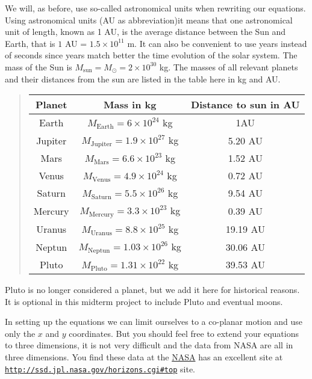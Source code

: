 \documentclass[%
oneside,                 %
final,                   %
10pt]{article}
\begin{document}
We will, as before, use so-called astronomical units when rewriting our equations. 
Using astronomical units (AU as abbreviation)it means that 
one astronomical unit of length, known as 1 AU, is the average distance between the Sun and Earth, that is
$1$ AU = $1.5\times 10^{11}$ m.  It can also be convenient to use years instead of seconds since years match
better the time evolution of the solar system. The mass of the Sun is $M_{\mathrm{sun}}=M_{\odot}=2\times 10^{30}$ kg. The masses of all relevant planets and their distances from the sun are listed in the table here in kg and AU.


\begin{quote}
\begin{tabular}{ccc}
\hline
\multicolumn{1}{c}{ Planet } & \multicolumn{1}{c}{ Mass in kg } & \multicolumn{1}{c}{ Distance to  sun in AU } \\
\hline
Earth   & $M_{\mathrm{Earth}}=6\times 10^{24}$ kg     & 1AU                    \\
Jupiter & $M_{\mathrm{Jupiter}}=1.9\times 10^{27}$ kg & 5.20 AU                \\
Mars    & $M_{\mathrm{Mars}}=6.6\times 10^{23}$ kg    & 1.52 AU                \\
Venus   & $M_{\mathrm{Venus}}=4.9\times 10^{24}$ kg   & 0.72 AU                \\
Saturn  & $M_{\mathrm{Saturn}}=5.5\times 10^{26}$ kg  & 9.54 AU                \\
Mercury & $M_{\mathrm{Mercury}}=3.3\times 10^{23}$ kg & 0.39 AU                \\
Uranus  & $M_{\mathrm{Uranus}}=8.8\times 10^{25}$ kg  & 19.19 AU               \\
Neptun  & $M_{\mathrm{Neptun}}=1.03\times 10^{26}$ kg & 30.06 AU               \\
Pluto   & $M_{\mathrm{Pluto}}=1.31\times 10^{22}$ kg  & 39.53 AU               \\
\hline
\end{tabular}
\end{quote}

\noindent
Pluto is no longer considered a planet, but we add it here for
historical reasons. It is optional in this midterm project to include
Pluto and eventual moons.

In setting up the equations we can limit ourselves to a co-planar
motion and use only the $x$ and $y$ coordinates. But you should feel
free to extend your equations to three dimensions, it is not very
difficult and the data from NASA are all in three dimensions.
You find these data at the 
\href{{http://www.nasa.gov/index.html}}{NASA} has an excellent site at \href{{http://ssd.jpl.nasa.gov/horizons.cgi#top}}{\nolinkurl{http://ssd.jpl.nasa.gov/horizons.cgi\#top}} site.
\end{document}
